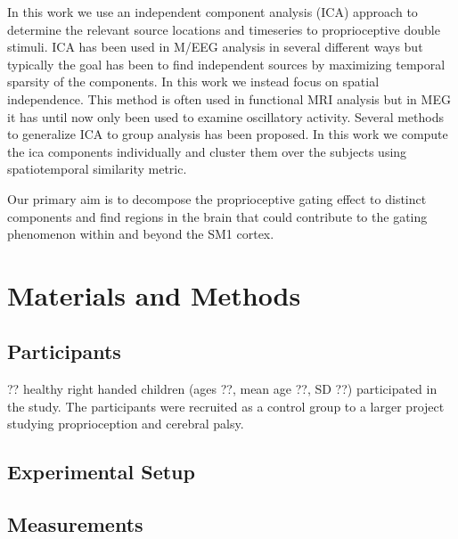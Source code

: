 \documentclass[]{article}
\begin{document}
In this work we use an independent component analysis (ICA) approach to determine the relevant source locations and timeseries to proprioceptive double stimuli. ICA has been used in M/EEG analysis in several different ways but typically the goal has been to find independent sources by maximizing temporal sparsity of the components. In this work we instead focus on spatial independence. This method is often used in functional MRI analysis but in MEG it has until now only been used to examine oscillatory activity. Several methods to generalize ICA to group analysis has been proposed. In this work we compute the ica components individually and cluster them over the subjects using spatiotemporal similarity metric.

Our primary aim is to  decompose the proprioceptive gating effect to distinct components and find regions in the brain that could contribute to the gating phenomenon within and beyond the SM1 cortex. 

\section*{Materials and Methods}

\subsection*{Participants}

?? healthy right handed children (ages ??, mean age ??, SD ??) participated in the study. The participants were recruited as a control group to a larger project studying proprioception and cerebral palsy.

\subsection*{Experimental Setup}


\subsection*{Measurements}
\end{document}
